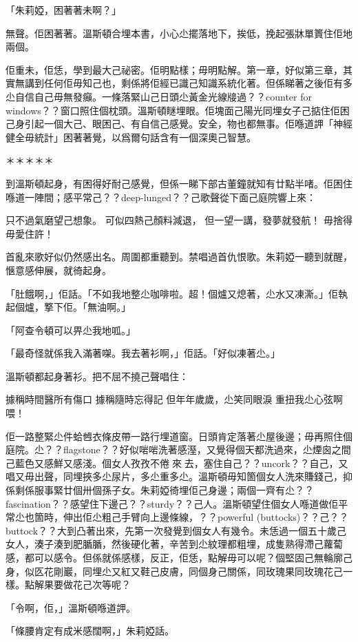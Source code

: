 「朱莉婭，困著著未啊？」

無聲。佢困著著。溫斯頓合埋本書，小心尐擺落地下，挨低，挽起張牀單篢住佢地兩個。

佢重未，佢恁，學到最大己祕密。佢明點樣；毋明點解。第一章，好似第三章，其實無講到任何佢毋知己也，剩係將佢經已識己知識系統化著。但係睇著之後佢有多尐自信自己毋無發癲。一條落緊山己日頭尐黃金光線𤗈過？？counter for windows？？窗口照住個枕頭。溫斯頓瞇埋眼。佢塊面己陽光同埋女子己掂住佢困己身引起一個大己、眼困己、有自信己感覺。安全，物也都無事。佢喺道䛅「神經健全毋統計」困著著覺，以爲爾句話含有一個深奧己智慧。

＊＊＊＊＊

到溫斯頓起身，有困得好耐己感覺，但係一睇下部古董鐘就知有廿點半啫。佢困住喺道一陣間；感平常己？？deep-lunged？？己歌聲從下面己庭院響上來：

	只不過氣磨望己想𧰼。
	可似四熱己顏料減退，
	但一望一講，發夢就發航！
	毋捨得毋愛住許！

首亂來歌好似仍然感出名。周圍都重聽到。禁唱過首仇恨歌。朱莉婭一聽到就醒，愜意感伸展，就徛起身。

「肚餓啊，」佢話。「不如我地整尐咖啡啦。超！個爐又熄著，尐水又凍澌。」佢執起個爐，撉下佢。「無油啊。」

「阿查令頓可以畀尐我地呱。」

「最奇怪就係我入滿著㗎。我去著衫啊，」佢話。「好似凍著尐。」

溫斯頓都起身著衫。把不屈不撓己聲唱住：

	據稱時間醫所有傷口
	據稱隨時忘得記
	但年年歲歲，尐笑同眼淚
	重扭我尐心弦啊喂！

佢一路整緊尐件蛤乸衣條皮帶一路行埋道窗。日頭肯定落著尐屋後邊；毋再照住個庭院。尐？？flagstone？？好似啱啱洗著感溼，又覺得個天都洗過來，尐煙囪之間己藍色又感鮮又感淺。個女人孜孜不倦𨆐來𨆐去，塞住自己？？uncork？？自己，又唱又毋出聲，同埋挾多尐尿片，多尐重多尐。溫斯頓毋知箇個女人洗來賺錢己，抑係剩係服事緊廿個卅個孫子女。朱莉婭徛埋佢己身邊；兩個一齊有尐？？fascination？？感望住下邊己？？sturdy？？己人。溫斯頓望住個女人喺道做佢平常尐也箇時，伸出佢尐粗己手臂向上邊條線，？？powerful (buttocks)？？己？？buttock？？大到凸著出來，先第一次發覺到個女人有幾令。未恁過一個五十歲己女人，湊子湊到肥腯腯，然後硬化著，辛苦到尐紋理都粗埋，成隻熟得滯己蘿蔔感，都可以感令。但係就係感樣，反正，佢恁，點解毋可以呢？個堅固己無輪廓己身，似匛花剛巖，同埋尐又紅又鞋己皮膚，同個身己關係，同玫瑰果同玫瑰花己一樣。點解果要做花己次等呢？

「令啊，佢，」溫斯頓喺道䛅。

「條腰肯定有成米感闊啊，」朱莉婭話。

